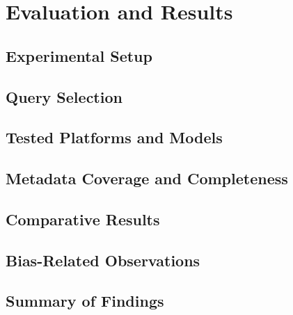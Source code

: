 \chapter{Evaluation and Results}
\label{cha:evaluation-and-results}

\section{Experimental Setup}

\section{Query Selection}

\section{Tested Platforms and Models}

\section{Metadata Coverage and Completeness}

\section{Comparative Results}

\section{Bias-Related Observations}

\section{Summary of Findings}
